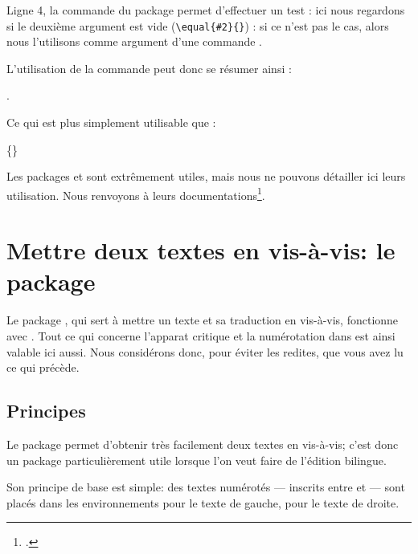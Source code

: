 Ligne 4, la commande  du package  permet d'effectuer un test : ici nous regardons si le deuxième argument est vide (\verb=\equal{#2}{}=) : si ce n'est pas le cas, alors nous l'utilisons  comme argument d'une commande .

 L'utilisation de la commande peut donc se résumer ainsi : 
 
 . 
 
Ce qui est  plus simplement utilisable que :

\{\}

\begin{plusloins}
Les packages  et  sont extrêmement utiles, mais nous ne pouvons détailler ici leurs utilisation. Nous renvoyons à leurs documentations\footcites{ifthen}{xargs}.
\end{plusloins}





 






\section{Mettre deux textes en vis-à-vis: le package }

\begin{prealable}
Le package , qui sert à mettre un texte et sa traduction en vis-à-vis, fonctionne avec . Tout ce qui concerne l'apparat critique et la numérotation dans  est ainsi valable ici aussi. Nous considérons donc, pour éviter les redites, que vous avez lu ce qui précède.
\end{prealable}


\subsection{Principes}

Le package  permet d'obtenir très facilement deux textes en vis-à-vis; c'est donc un package particulièrement utile lorsque l'on veut faire de l'édition bilingue.

Son principe de base est simple:  des textes numérotés  --- inscrits entre  et   --- sont placés dans les environnements  pour le texte de gauche,   pour le texte de droite.

